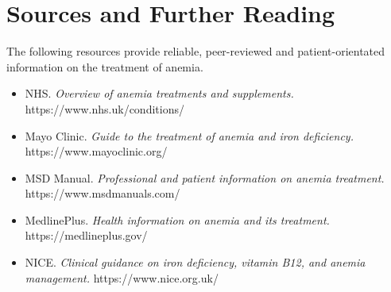 \section*{Sources and Further Reading}
The following resources provide reliable, peer-reviewed and patient-orientated information on the treatment of anemia.

\begin{itemize}
    \item NHS. \textit{Overview of anemia treatments and supplements.} https://www.nhs.uk/conditions/
    \item Mayo Clinic. \textit{Guide to the treatment of anemia and iron deficiency.} https://www.mayoclinic.org/
    \item MSD Manual. \textit{Professional and patient information on anemia treatment.} https://www.msdmanuals.com/
    \item MedlinePlus. \textit{Health information on anemia and its treatment.} https://medlineplus.gov/
    \item NICE. \textit{Clinical guidance on iron deficiency, vitamin B12, and anemia management.} https://www.nice.org.uk/
\end{itemize}
